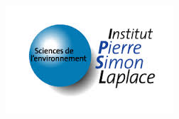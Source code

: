 \begin{figure}
\begin{minipage}[c]{0.2\linewidth}
\begin{center}
            \end{center}
        \end{minipage}
        \hfill
        \begin{minipage}[c]{0.2\linewidth}
            \begin{center}
                \includegraphics[height=0.09\textheight]{./logos/ipsl}
            \end{center}
        \end{minipage}

    \end{figure}

